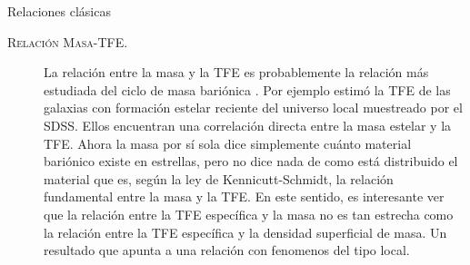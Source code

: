 \documentclass[xcolor=dvipsnames,4pt,hyperref={colorlinks,citecolor=black,linkcolor=black,urlcolor=black}]{beamer}
\begin{document}
\begin{frame}{Relaciones clásicas}

\begin{description}
%
\item[\textsc{Relación Masa-TFE.}] La relación entre la masa y la TFE es probablemente la relación
más estudiada del ciclo de masa bariónica \citep[e.\,g.][]{Schmidt1959, Kennicutt1998}. Por ejemplo
\citet{Brinchmann2004} estimó la TFE de las galaxias con formación estelar reciente del universo
local muestreado por el SDSS. Ellos encuentran una correlación directa entre la masa estelar y la
TFE.
Ahora la masa por sí sola dice simplemente cuánto material bariónico existe en estrellas, pero no
dice nada de como está distribuido el material que es, según la ley de Kennicutt-Schmidt, la
relación fundamental entre la masa y la TFE. En este sentido, es interesante ver que la relación
entre la TFE específica y la masa no es tan estrecha como la relación entre la TFE específica y la
densidad superficial de masa. Un resultado que apunta a una relación con fenomenos del tipo local.


\end{description}
\end{frame}
\end{document}
